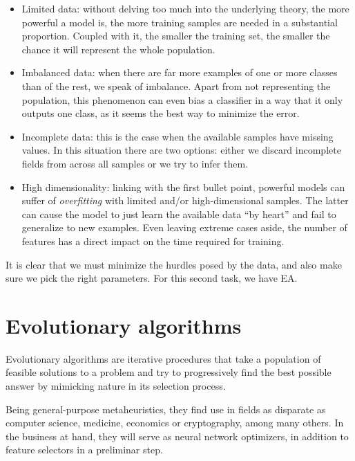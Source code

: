     \begin{itemize}

    	\item
    	Limited data: without delving too much into the underlying theory, the more powerful a model is, the more training samples are needed in a substantial proportion. Coupled with it, the smaller the training set, the smaller the chance it will represent the whole population.

    	\item
    	Imbalanced data: when there are far more examples of one or more classes than of the rest, we speak of imbalance. Apart from not representing the population, this phenomenon can even bias a classifier in a way that it only outputs one class, as it seems the best way to minimize the error.

    	\item
    	Incomplete data: this is the case when the available samples have missing values. In this situation there are two options: either we discard incomplete fields from across all samples or we try to infer them.

    	\item
    	High dimensionality: linking with the first bullet point, powerful models can suffer of \textit{overfitting} with limited and/or high-dimensional samples. The latter can cause the model to just learn the available data ``by heart'' and fail to generalize to new examples. Even leaving extreme cases aside, the number of features has a direct impact on the time required for training.

    \end{itemize}

    It is clear that we must minimize the hurdles posed by the data, and also make sure we pick the right parameters. For this second task, we have \acf{EA}.

\section{Evolutionary algorithms}

	Evolutionary algorithms are iterative procedures that take a population of feasible solutions to a problem and try to progressively find the best possible answer by mimicking nature in its selection process. 

	Being general-purpose metaheuristics, they find use in fields as disparate as computer science, medicine, economics or cryptography, among many others. In the business at hand, they will serve as neural network optimizers, in addition to feature selectors in a preliminar step.

